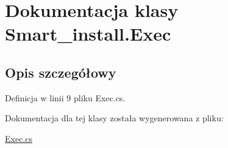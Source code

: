 \hypertarget{class_smart__install_1_1_exec}{\section{Dokumentacja klasy Smart\+\_\+install.\+Exec}
\label{class_smart__install_1_1_exec}
}


\subsection{Opis szczegółowy}


Definicja w linii 9 pliku Exec.\+cs.



Dokumentacja dla tej klasy została wygenerowana z pliku\+:\begin{DoxyCompactItemize}
\item 
\hyperlink{_exec_8cs}{Exec.\+cs}\end{DoxyCompactItemize}
